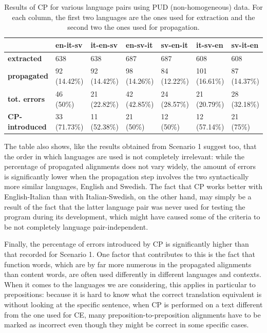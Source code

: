 \begin{table}[H]
    \centering
    \scriptsize
    \begin{tabular}{|l|l|l|l|l|l|l|}
    \hline
    \textbf{}                     & \textbf{en-it-sv} & \textbf{it-en-sv} & \textbf{en-sv-it} & \textbf{sv-en-it} & \textbf{it-sv-en} & \textbf{sv-it-en} \\ \hline
    \textbf{extracted}   & 638               & 638               & 687               & 687               & 608               & 608               \\ \hline
    \textbf{propagated}                    & 92 (14.42\%)      & 92 (14.42\%)      & 98 (14.26\%)      & 84 (12.22\%)      & 101 (16.61\%)     & 87 (14.37\%)      \\ \hline
    \textbf{tot. errors}                   & 46 (50\%)         & 21 (22.82\%)      & 42 (42.85\%)      & 24 (28.57\%)      & 21 (20.79\%)      & 28 (32.18\%)      \\ \hline
    \textbf{CP-introduced}                 & 33 (71.73\%)      & 11 (52.38\%)      & 21 (50\%)         & 12 (50\%)         & 12 (57.14\%)      & 21 (75\%)         \\ \hline
    \end{tabular}
    \caption[Performance of CP Scenario 2 on manually annotated non-homogeneous data]{Results of CP for various language pairs using PUD (non-homogeneous) data. For each column, the first two languages are the ones used for extraction and the second two the ones used for propagation.}
    \label{tcp2pud}
    \end{table}

The table also shows, like the results obtained from Scenario 1 suggest too, that the order in which languages are used is not completely irrelevant: while the percentage of propagated alignments does not vary widely, the amount of errors is significantly lower when the propagation step involves the two syntactically more similar languages, English and Swedish. The fact that CP works better with English-Italian than with Italian-Swedish, on the other hand, may simply be a result of the fact that the latter language pair was never used for testing the program during its development, which might have caused some of the criteria to be not completely language pair-independent. \smallskip

Finally, the percentage of errors introduced by CP is significantly higher than that recorded for Scenario 1. One factor that contributes to this is the fact that function words, which are by far more numerous in the propagated alignments than content words, are often used differently in different languages and contexts. When it comes to the languages we are considering, this applies in particular to prepositions: because it is hard to know what the correct translation equivalent is without looking at the specific sentence, when CP is performed on a text different from the one used for CE, many preposition-to-preposition alignments have to be marked as incorrect even though they might be correct in some specific cases.

